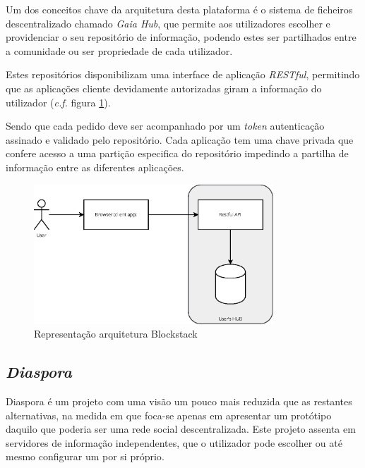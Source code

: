 Um dos conceitos chave da arquitetura desta plataforma é o sistema de ficheiros descentralizado chamado \emph{Gaia Hub}, que permite aos utilizadores escolher e providenciar o seu repositório de informação, podendo estes ser partilhados entre a comunidade ou ser propriedade de cada utilizador.

Estes repositórios disponibilizam uma interface de aplicação \emph{RESTful}, permitindo que as aplicações cliente devidamente autorizadas giram a informação do utilizador (\emph{c.f.} figura \ref{estado_arte_representacao_blockstack}).

Sendo que cada pedido deve ser acompanhado por um \emph{token} autenticação assinado e validado pelo repositório. Cada aplicação tem uma chave privada que confere acesso a uma partição especifica do repositório impedindo a partilha de informação entre as diferentes aplicações\cite{blockstack_white_paper}.

\begin{figure}[H]
    \begin{center}
    \includegraphics[width=0.8\textwidth]{figures/estado_arte-Blockstack.eps}
    \caption{Representação arquitetura Blockstack}
    \label{estado_arte_representacao_blockstack}
    \end{center}
\end{figure}

\subsection{\emph{Diaspora}}
Diaspora é um projeto com uma visão um pouco mais reduzida que as restantes alternativas, na medida em que foca-se apenas em apresentar um protótipo daquilo que poderia ser uma rede social descentralizada. Este projeto assenta em servidores de informação independentes, que o utilizador pode escolher ou até mesmo configurar um por si próprio\cite{diaspora_wiki}.

